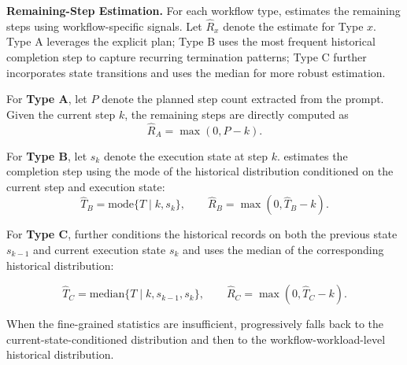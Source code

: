 
\textbf{Remaining-Step Estimation.}
For each workflow type, \sysname estimates the remaining steps using workflow-specific signals. Let $\hat{R}_x$ denote the estimate for Type $x$. Type A leverages the explicit plan; Type B uses the most frequent historical completion step to capture recurring termination patterns; Type C further incorporates state transitions and uses the median for more robust estimation.

For \textbf{Type A}, let $P$ denote the planned step count extracted from the prompt. 
Given the current step $k$, the remaining steps are directly computed as
\begin{equation}
\hat{R}_{A} = \max(0, P-k).
\end{equation}

For \textbf{Type B}, let $s_k$ denote the execution state at step $k$. 
\sysname estimates the completion step using the mode of the historical distribution conditioned on the current step and execution state:
\begin{equation}
\hat{T}_{B} =
\mathrm{mode}\{T \mid k, s_k\},
\qquad
\hat{R}_{B} = \max(0, \hat{T}_{B}-k).
\end{equation}

For \textbf{Type C}, \sysname further conditions the historical records on both the previous state $s_{k-1}$ and current execution state $s_k$ and uses the median of the corresponding historical distribution:

\begin{equation}
\hat{T}_{C} =
\mathrm{median}\{T \mid k, s_{k-1}, s_k\},
\qquad
\hat{R}_{C} = \max(0, \hat{T}_{C}-k).
\end{equation}

When the fine-grained statistics are insufficient, \sysname progressively falls back to the current-state-conditioned distribution and then to the workflow-workload-level historical distribution.


